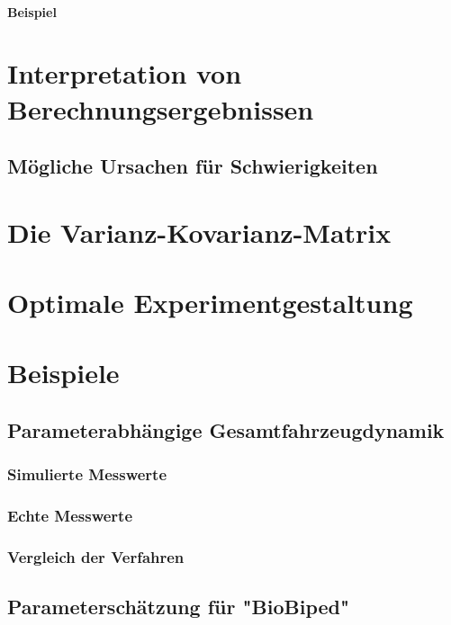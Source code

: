         \paragraph{Beispiel} %

    \section{Interpretation von Berechnungsergebnissen} %

        \subsection{Mögliche Ursachen für Schwierigkeiten} %

    \section{Die Varianz-Kovarianz-Matrix} %

    \section{Optimale Experimentgestaltung} %

    \section{Beispiele} %

        \subsection{Parameterabhängige Gesamtfahrzeugdynamik} %

            \subsubsection{Simulierte Messwerte} %

            \subsubsection{Echte Messwerte} %

            \subsubsection{Vergleich der Verfahren} %

        \subsection{Parameterschätzung für "BioBiped"} %
